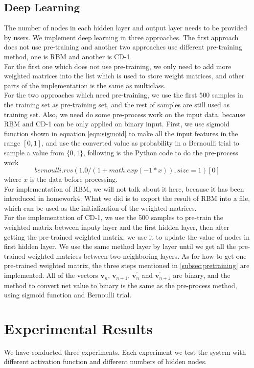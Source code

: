 \documentclass[11pt,letterpaper]{article}
\begin{document}
\subsection{Deep Learning}
The number of nodes in each hidden layer and output layer needs to be provided by users. We implement deep learning in three approaches. The first approach does not use pre-training and another two approaches use different pre-training method, one is RBM and another is CD-1. \\
For the first one which does not use pre-training, we only need to add more weighted matrices into the list which is used to store weight matrices, and other parts of the implementation is the same as multiclass.\\
For the two approaches which need pre-training, we use the first 500 samples in the training set as pre-training set, and the rest of samples are still used as training set. Also, we need do some pre-process work on the input data, because RBM and CD-1 can be only applied on binary input. First, we use sigmoid function shown in equation \ref{eqn:sigmoid} to make all the input features in the range $[0, 1]$, and use the converted value as probability in a Bernoulli trial to sample a value from $\{0, 1\}$, following is the Python code to do the pre-process work 
$$bernoulli.rvs(1.0/(1 + math.exp(-1 * x)), size=1)[0]$$
where $x$ is the data before processing. \\
For implementation of RBM, we will not talk about it here, because it has been introduced in homework4. What we did is to export the result of RBM into a file, which can be used as the initialization of the weighted matrices. \\
For the implementation of CD-1, we use the 500 samples to pre-train the weighted matrix between inputy layer and the first hidden layer, then after getting the pre-trained weighted matrix, we use it to update the value of nodes in first hidden layer. We use the same method layer by layer until we get all the pre-trained weighted matrices between two neighboring layers. As for how to get one pre-trained weighted matrix, the three steps mentioned in \ref{subsec:pretraining} are implemented. All of the vectors $\mathbf{v}_n$, $\mathbf{v}_{n+1}$, $\mathbf{v}^{\prime}_n$ and $\mathbf{v}^{\prime}_{n+1}$ are binary, and the method to convert net value to binary is the same as the pre-process method, using sigmoid function and Bernoulli trial. 

\section{Experimental Results}
We have conducted three experiments.
Each experiment we test the system with different activation function and different numbers of hidden nodes.
\end{document}
